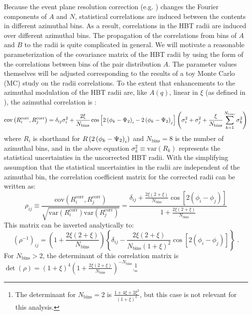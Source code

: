 Because the event plane resolution correction (e.g. \Eqn{\ref{eq:a_corr}}) changes the Fourier components of $A$ and $N$, statistical correlations are induced between the contents in different azimuthal bins.
As a result, correlations in the HBT radii are induced over different azimuthal bins.
The propagation of the correlations from bins of $A$ and $B$ to the radii is quite complicated in general.
We will motivate a reasonable parameterization of the covariance matrix of the HBT radii by using the form of the correlations between bins of the pair distribution $A$.
The parameter values themselves will be adjusted corresponding to the results of a toy Monte Carlo (MC) study on the radii correlations.
To the extent that enhancements to the azimuthal modulation of the HBT radii are, like $A(q)$, linear in $\xi$ (as defined in \Sect{\ref{subsubsec:epres}}), the azimuthal correlation is :
\begin{equation} \label{eq:azi_corr}
\textrm{cov}\left( R^\textrm{corr}_i, R^\textrm{corr}_j \right) = \delta_{ij} \sigma^2_{i} + \frac{2\xi}{N_\textrm{bins}} \cos\left[2\left(\phi_{k}-\Psi_{2}\right)_i - 2\left(\phi_{k}-\Psi_{2}\right)_j \right] \left( \sigma^2_{i} + \sigma^2_{j} + \frac{\xi}{N_\textrm{bins}} \sum_{k=1}^{N_\textrm{bins}} \sigma^2_{k} \right)
\end{equation}
where $R_i$ is shorthand for $R\left(2\left(\phi_{k}-\Psi_{2}\right)_i\right)$ and $N_\textrm{bins}=8$ is the number of azimuthal bins, and in the above equation $\sigma^2_{k} \equiv \mathrm{var}(R_k)$ represents the statistical uncertainties in the uncorrected HBT radii. With the simplifying assumption that the statistical uncertainties in the radii are independent of the azimuthal bin, the correlation coefficient matrix for the corrected radii can be written as:
\begin{equation} \label{eq:corr_coeff_matrix}
  \rho_{ij} \equiv \frac{\mathrm{cov}\left( R^\textrm{corr}_i, R^\textrm{corr}_j \right)}{\sqrt{\mathrm{var}\left( R^\textrm{corr}_i \right) \mathrm{var}\left( R^\textrm{corr}_j \right)}}
  = \frac{\delta_{ij} + \frac{2\xi(2+\xi)}{N_\textrm{bins}} \cos{\left[2(\phi_i-\phi_j)\right]}}{1 + \frac{2\xi(2+\xi)}{N_\textrm{bins}}}
\end{equation}
This matrix can be inverted analytically to:
\begin{equation} \label{eq:corr_coeff_matrix_inv}
(\rho^{-1})_{ij} = \left(1 + \frac{2\xi(2+\xi)}{N_\textrm{bins}}\right)\left\{\delta_{ij} - \frac{2\xi(2+\xi)}{N_\textrm{bins}(1+\xi)^2} \cos{\left[2(\phi_i-\phi_j)\right]}\right\} \;.
\end{equation}
For $N_\textrm{bins} > 2$, the determinant of this correlation matrix is $\det(\rho) = \left(1 + \xi\right)^{4}\left(1 + \frac{2\xi(2+\xi)}{N_\textrm{bins}} \right)^{-N_\textrm{bins}}$.\footnote{The determinant for $N_\textrm{bins} = 2$ is $\frac{1+4\xi+2\xi^2}{(1+\xi)^4}$, but this case is not relevant for this analysis.}

